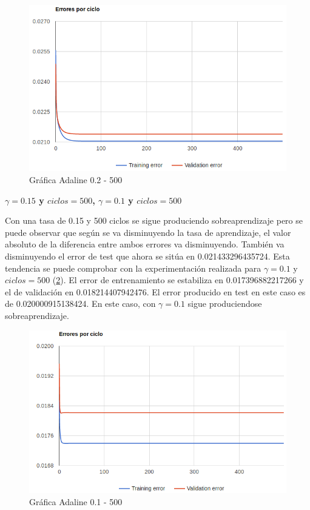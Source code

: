 \documentclass[11pt,spanish,listoffigures,listoftables]{tfgetsinf}
\begin{document}
\begin{figure}[H]
\centering
\includegraphics[scale=0.5]{2500}
\caption{Gráfica Adaline 0.2 - 500}\label{fig:2500}
\end{figure}

\par \textbf{$\gamma = 0.15$ y $ciclos = 500$, $\gamma = 0.1$ y $ciclos = 500$}

\par Con una tasa de 0.15 y 500 ciclos se sigue produciendo sobreaprendizaje pero se puede observar que según se va disminuyendo la tasa de aprendizaje, el valor absoluto de la diferencia entre ambos errores va disminuyendo. También va disminuyendo el error de test que ahora se sitúa en 0.021433296435724. Esta tendencia se puede comprobar con la experimentación realizada para $\gamma = 0.1$ y $ciclos = 500$ (\ref{fig:1500}). El error de entrenamiento se estabiliza en 0.017396882217266 y el de validación en 0.018214407942476. El error producido en test en este caso es de 0.020000915138424. En este caso, con $\gamma = 0.1$ sigue produciendose sobreaprendizaje.

\begin{figure}[H]
\centering
\includegraphics[scale=0.5]{1500}
\caption{Gráfica Adaline 0.1 - 500}\label{fig:1500}
\end{figure}
\end{document}
